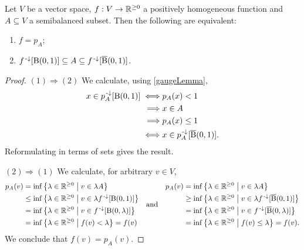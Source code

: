 \begin{lemma} \label{gaugeClassificationLemma}
Let $V$ be a vector space, $f: V\to \mathbb{R}^{\geq 0}$ a positively homogeneous function and $A \subseteq V$ a semibalanced subset.
Then the following are equivalent:
\begin{enumerate}
\item $f = p_A$;
\item $f^{{\text{\hspace{0.15em}-}\downarrow}}[\operatorname{B}(0,1)] \subseteq A \subseteq f^{{\text{\hspace{0.15em}-}\downarrow}}[\operatorname{\overline{B}}(0,1)]$.
\end{enumerate}
\end{lemma}
\begin{proof}
$(1) \Rightarrow (2)$ We calculate, using \ref{gaugeLemma},
\begin{align*}
x\in p_{A}^{\text{\hspace{0.15em}-}\downarrow}[\operatorname{B}(0,1)] \iff& p_{A}(x) < 1 \\
\implies& x\in A \\
\implies& p_{A}(x) \leq 1 \\
\iff& x\in p_{A}^{\text{\hspace{0.15em}-}\downarrow}[\operatorname{\overline{B}}(0,1)].
\end{align*}
Reformulating in terms of sets gives the result.

$(2) \Rightarrow (1)$ We calculate, for arbitrary $v\in V$,
\[ \begin{aligned}
p_A(v) &= \inf\setbuilder{\lambda\in \R^{\geq 0}}{v\in \lambda A} \\
&\leq \inf\setbuilder{\lambda\in \R^{\geq 0}}{v\in \lambda f^{\preimf}[\ball(0,1)]} \\
&= \inf\setbuilder{\lambda\in \R^{\geq 0}}{v\in f^{\preimf}[\ball(0,\lambda)]} \\
&= \inf\setbuilder{\lambda\in \R^{\geq 0}}{f(v) < \lambda} = f(v)
\end{aligned} \quad\text{and}\quad \begin{aligned}
p_A(v) &= \inf\setbuilder{\lambda\in \R^{\geq 0}}{v\in \lambda A} \\
&\geq \inf\setbuilder{\lambda\in \R^{\geq 0}}{v\in \lambda f^{\preimf}[\cball(0,1)]} \\
&= \inf\setbuilder{\lambda\in \R^{\geq 0}}{v\in f^{\preimf}[\cball(0,\lambda)]} \\
&= \inf\setbuilder{\lambda\in \R^{\geq 0}}{f(v) \leq \lambda} = f(v).
\end{aligned} \]
We conclude that $f(v) = p_A(v)$.
\end{proof}

